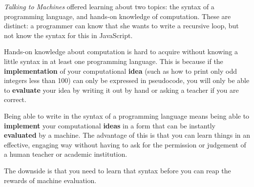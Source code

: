 \emph{Talking to Machines} offered learning about two topics: the syntax
of a programming language, and hands-on knowledge of computation. These
are distinct: a programmer can know that she wants to write a recursive
loop, but not know the syntax for this in JavaScript.

Hands-on knowledge about computation is hard to acquire without knowing
a little syntax in at least one programming language. This is because if
the \textbf{implementation} of your computational \textbf{idea} (such as
how to print only odd integers less than 100) can only be expressed in
pseudocode, you will only be able to \textbf{evaluate} your idea by
writing it out by hand or asking a teacher if you are correct.

Being able to write in the syntax of a programming language means being
able to \textbf{implement} your computational \textbf{ideas} in a form
that can be instantly \textbf{evaluated} by a machine. The advantage of this is that you can learn things in an effective, engaging way
without having to ask for the permission or judgement of a human teacher
or academic institution.

The downside is that you need to learn that syntax before you can reap
the rewards of machine evaluation. 
